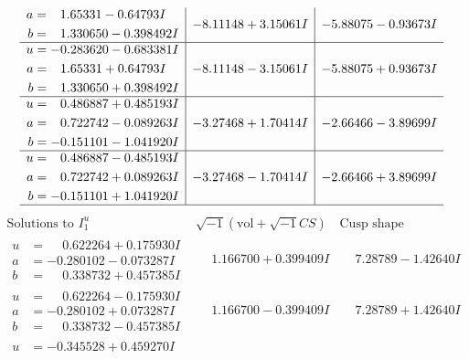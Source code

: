 \documentclass[1p]{elsarticle_modified}
\theoremstyle{definition}
\newcommand{\I}{\sqrt{-1}}
\begin{document}
$$\begin{array}{c|c|c}
\begin{aligned}
a &= \phantom{-}1.65331 - 0.64793 I \\
b &= \phantom{-}1.330650 - 0.398492 I\end{aligned}
 & -8.11148 + 3.15061 I & -5.88075 - 0.93673 I \\ \hline\begin{aligned}
u &= -0.283620 - 0.683381 I \\
a &= \phantom{-}1.65331 + 0.64793 I \\
b &= \phantom{-}1.330650 + 0.398492 I\end{aligned}
 & -8.11148 - 3.15061 I & -5.88075 + 0.93673 I \\ \hline\begin{aligned}
u &= \phantom{-}0.486887 + 0.485193 I \\
a &= \phantom{-}0.722742 - 0.089263 I \\
b &= -0.151101 - 1.041920 I\end{aligned}
 & -3.27468 + 1.70414 I & -2.66466 - 3.89699 I \\ \hline\begin{aligned}
u &= \phantom{-}0.486887 - 0.485193 I \\
a &= \phantom{-}0.722742 + 0.089263 I \\
b &= -0.151101 + 1.041920 I\end{aligned}
 & -3.27468 - 1.70414 I & -2.66466 + 3.89699 I\\
 \hline 
 \end{array}$$\newpage$$\begin{array}{c|c|c}  
\text{Solutions to }I^u_{1}& \I (\text{vol} + \sqrt{-1}CS) & \text{Cusp shape}\\
 \hline 
\begin{aligned}
u &= \phantom{-}0.622264 + 0.175930 I \\
a &= -0.280102 - 0.073287 I \\
b &= \phantom{-}0.338732 + 0.457385 I\end{aligned}
 & \phantom{-}1.166700 + 0.399409 I & \phantom{-}7.28789 - 1.42640 I \\ \hline\begin{aligned}
u &= \phantom{-}0.622264 - 0.175930 I \\
a &= -0.280102 + 0.073287 I \\
b &= \phantom{-}0.338732 - 0.457385 I\end{aligned}
 & \phantom{-}1.166700 - 0.399409 I & \phantom{-}7.28789 + 1.42640 I \\ \hline\begin{aligned}
u &= -0.345528 + 0.459270 I \\

\end{aligned}
\end{array}$$
\end{document}
